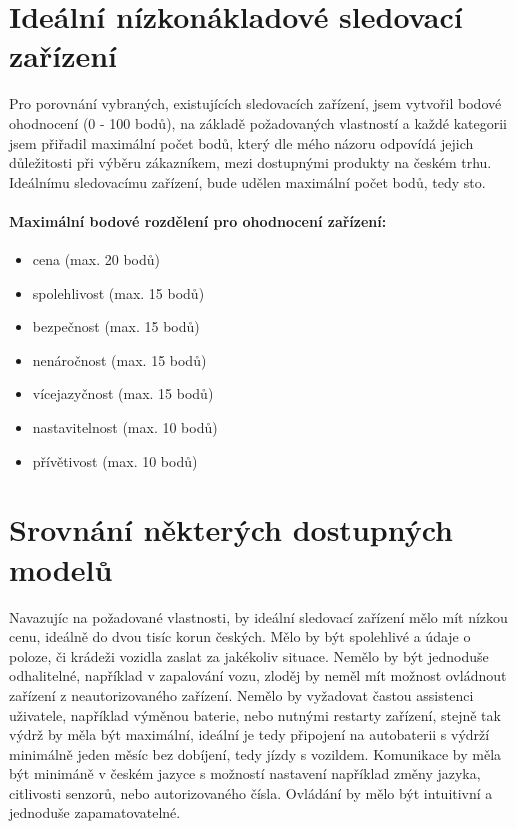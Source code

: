 \documentclass[FM,BP]{tulthesis}  %
\begin{document}

\section{Ideální nízkonákladové sledovací zařízení}
Pro porovnání vybraných, existujících sledovacích zařízení, jsem vytvořil bodové ohodnocení (0 - 100 bodů), na základě požadovaných vlastností a každé kategorii jsem přiřadil maximální počet bodů, který dle mého názoru odpovídá jejich důležitosti při výběru zákazníkem, mezi dostupnými produkty na českém trhu. Ideálnímu sledovacímu zařízení, bude udělen maximální počet bodů, tedy sto.

\paragraph{Maximální bodové rozdělení pro ohodnocení zařízení:}
\begin{itemize}
\item cena (max. 20 bodů)
\item spolehlivost (max. 15 bodů)
\item bezpečnost (max. 15 bodů)
\item nenáročnost (max. 15 bodů)
\item vícejazyčnost (max. 15 bodů)
\item nastavitelnost (max. 10 bodů)
\item přívětivost (max. 10 bodů)
\end{itemize}

\section{Srovnání některých dostupných modelů}
Navazujíc na požadované vlastnosti, by ideální sledovací zařízení mělo mít nízkou cenu, ideálně do dvou tisíc korun českých. Mělo by být spolehlivé a údaje o poloze, či krádeži vozidla zaslat za jakékoliv situace. Nemělo by být jednoduše odhalitelné, například v zapalování vozu, zloděj by neměl mít možnost ovládnout zařízení z neautorizovaného zařízení. Nemělo by vyžadovat častou assistenci uživatele, například výměnou baterie, nebo nutnými restarty zařízení, stejně tak výdrž by měla být maximální, ideální je tedy připojení na autobaterii s výdrží minimálně jeden měsíc bez dobíjení, tedy jízdy s vozildem. Komunikace by měla být minimáně v českém jazyce s možností nastavení například změny jazyka, citlivosti senzorů, nebo autorizovaného čísla. Ovládání by mělo být intuitivní a jednoduše zapamatovatelné.
\end{document}
